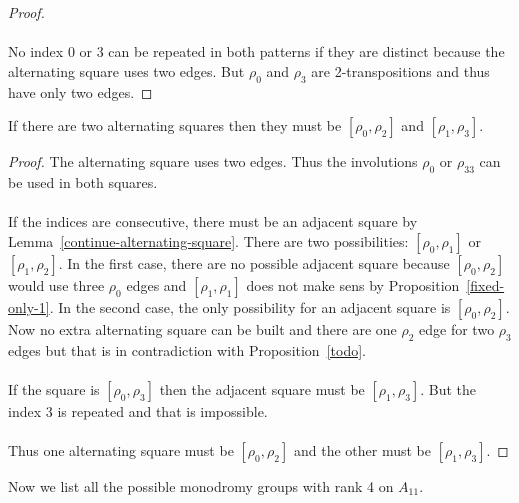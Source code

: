 \begin{proof}
  \paragraph{}
  No index 0 or 3 can be repeated in both patterns if they are distinct because the alternating square uses two edges. But $\rho_0$ and $\rho_3$ are 2-transpositions and thus have only two edges.

\end{proof}

\begin{lemma}
  If there are two alternating squares then they must be $[\rho_0, \rho_2]$ and $[\rho_1, \rho_3]$.
\end{lemma}

\begin{proof}
  The alternating square uses two edges. Thus the involutions $\rho_0$ or $\rho_33$ can be used in both squares.

  \paragraph{}
  If the indices are consecutive, there must be an adjacent square by Lemma~\ref{continue-alternating-square}. There are two possibilities: $[\rho_0, \rho_1]$ or $[\rho_1, \rho_2]$. In the first case, there are no possible adjacent square because $[\rho_0, \rho_2]$ would use three $\rho_0$ edges and $[\rho_1, \rho_1]$ does not make sens by Proposition~\ref{fixed-only-1}. In the second case, the only possibility for an adjacent square is $[\rho_0, \rho_2]$. Now no extra alternating square can be built and there are one $\rho_2$ edge for two $\rho_3$ edges but that is in contradiction with Proposition~\ref{todo}.

  \paragraph{}
  If the square is $[\rho_0, \rho_3]$ then the adjacent square must be $[\rho_1, \rho_3]$. But the index $3$ is repeated and that is impossible.

  \paragraph{}
  Thus one alternating square must be $[\rho_0, \rho_2]$ and the other must be $[\rho_1, \rho_3]$.

\end{proof}

Now we list all the possible monodromy groups with rank 4 on $A_{11}$.

